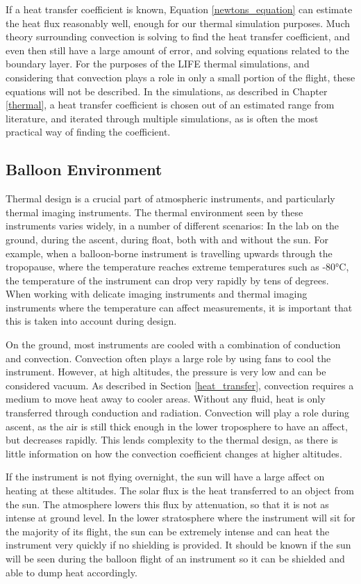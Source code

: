 If a heat transfer coefficient is known, Equation \ref{newtons_equation} can estimate the heat flux reasonably well, enough for our thermal simulation purposes. Much theory surrounding convection is solving to find the heat transfer coefficient, and even then still have a large amount of error, and solving equations related to the boundary layer. For the purposes of the LIFE thermal simulations, and considering that convection plays a role in only a small portion of the flight, these equations will not be described. In the simulations, as described in Chapter \ref{thermal}, a heat transfer coefficient is chosen out of an estimated range from literature, and iterated through multiple simulations, as is often the most practical way of finding the coefficient. 

\subsection{Balloon Environment} %
Thermal design is a crucial part of atmospheric instruments, and particularly thermal imaging instruments. The thermal environment seen by these instruments varies widely, in a number of different scenarios: In the lab on the ground, during the ascent, during float, both with and without the sun. For example, when a balloon-borne instrument is travelling upwards through the tropopause, where the temperature reaches extreme temperatures such as -80°C, the temperature of the instrument can drop very rapidly by tens of degrees. When working with delicate imaging instruments and thermal imaging instruments where the temperature can affect measurements, it is important that this is taken into account during design.

On the ground, most instruments are cooled with a combination of conduction and convection. Convection often plays a large role by using fans to cool the instrument. However, at high altitudes, the pressure is very low and can be considered vacuum. As described in Section \ref{heat_transfer}, convection requires a medium to move heat away to cooler areas. Without any fluid, heat is only transferred through conduction and radiation. Convection will play a role during ascent, as the air is still thick enough in the lower troposphere to have an affect, but decreases rapidly. This lends complexity to the thermal design, as there is little information on how the convection coefficient changes at higher altitudes. 

If the instrument is not flying overnight, the sun will have a large affect on heating at these altitudes. The solar flux is the heat transferred to an object from the sun. The atmosphere lowers this flux by attenuation, so that it is not as intense at ground level. In the lower stratosphere where the instrument will sit for the majority of its flight, the sun can be extremely intense and can heat the instrument very quickly if no shielding is provided. It should be known if the sun will be seen during the balloon flight of an instrument so it can be shielded and able to dump heat accordingly.

